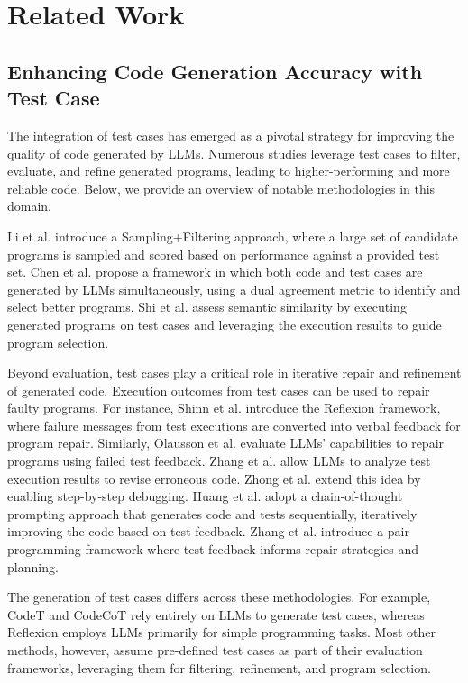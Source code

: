 \section{Related Work}
\label{sec:related-work}
\subsection{Enhancing Code Generation Accuracy with Test Case}

The integration of test cases has emerged as a pivotal strategy for improving the quality of code generated by LLMs. 
Numerous studies leverage test cases to filter, evaluate, and refine generated programs, leading to higher-performing and more reliable code. 
Below, we provide an overview of notable methodologies in this domain.


Li et al. \cite{li2022competition} introduce a Sampling+Filtering approach, 
where a large set of candidate programs is sampled and scored based on performance against a provided test set.
Chen et al. \cite{chen2022codet} propose a framework in which both code and test cases are generated by LLMs simultaneously, using a dual agreement metric to identify and select better programs. 
Shi et al. \cite{shi2022natural} assess semantic similarity by executing generated programs on test cases and leveraging the execution results to guide program selection.

Beyond evaluation, test cases play a critical role in iterative repair and refinement of generated code. 
Execution outcomes from test cases can be used to repair faulty programs. 
For instance, Shinn et al. \cite{shinn2024reflexion} introduce the Reflexion framework, 
where failure messages from test executions are converted into verbal feedback for program repair. 
Similarly, Olausson et al. \cite{olausson2023self} evaluate LLMs' capabilities to repair programs using failed test feedback. 
Zhang et al. \cite{zhang2023self} allow LLMs to analyze test execution results to revise erroneous code.
Zhong et al. \cite{Zhong0S24ldb} extend this idea by enabling step-by-step debugging.
Huang et al. \cite{huang2023codecot} adopt a chain-of-thought prompting \cite{brown2020language} approach that generates code and tests sequentially, iteratively improving the code based on test feedback.
Zhang et al. \cite{zhang2024pair} introduce a pair programming framework where test feedback informs repair strategies and planning.

The generation of test cases differs across these methodologies.
For example, CodeT \cite{chen2022codet} and CodeCoT \cite{huang2023codecot} rely entirely on LLMs to generate test cases, 
whereas Reflexion employs LLMs primarily for simple programming tasks. 
Most other methods, however, assume pre-defined test cases as part of their evaluation frameworks, 
leveraging them for filtering, refinement, and program selection.



